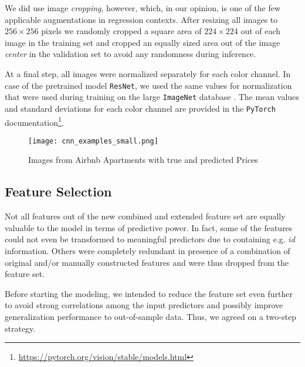 We did use image \emph{cropping}, however, which, in our opinion, is one of the few applicable augmentations in regression contexts.
After resizing all images to $256 \times 256$ pixels we randomly cropped a square area of $224 \times 224$ out of each image in the training set and cropped an equally sized area out of the image \emph{center} in the validation set to avoid any randomness during inference.

At a final step, all images were normalized separately for each color channel.
In case of the pretrained model \texttt{ResNet}, we used the same values for normalization that were used during training on the large \texttt{ImageNet} database \citep{russakovsky2015}.
The mean values and standard deviations for each color channel are provided in the \texttt{PyTorch} documentation\footnote{\url{https://pytorch.org/vision/stable/models.html}}.

\begin{figure}[t]
    \centering
    \texttt{[image: cnn\_examples\_small.png]}
    \caption{Images from Airbnb Apartments with true and predicted Prices}
    \label{fig:cnn-examples}
\end{figure}

\subsection{Feature Selection} \label{appendix:feature-selection}

Not all features out of the new combined and extended feature set are equally valuable to the model in terms of predictive power.
In fact, some of the features could not even be transformed to meaningful predictors due to containing e.g. \emph{id} information.
Others were completely redundant in presence of a combination of original and/or manually constructed features and were thus dropped from the feature set.

Before starting the modeling, we intended to reduce the feature set even further to avoid strong correlations among the input predictors and possibly improve generalization performance to out-of-sample data.
Thus, we agreed on a two-step strategy.

